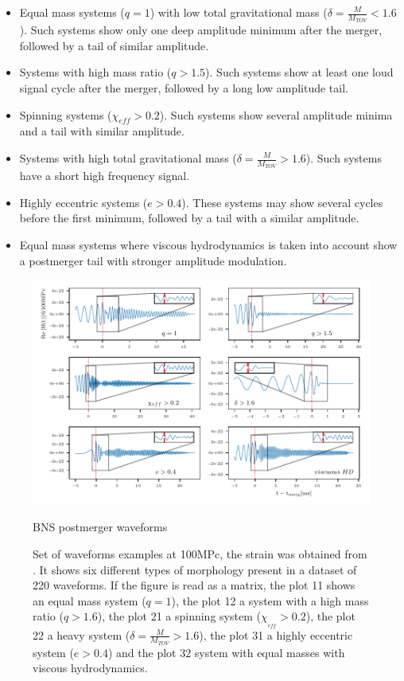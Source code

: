 \begin{itemize}
\item Equal mass systems ($q=1$) with low total gravitational mass ($\delta=\frac{M}{M_{TOV}}<1.6$). Such systems show only one deep amplitude minimum after the merger, followed by a tail of similar amplitude.

\item Systems with high mass ratio ($q>1.5$). Such systems show at least one loud signal cycle after the merger, followed by a long low amplitude tail.

\item Spinning systems ($\chi_{eff}>0.2$). Such systems show several amplitude minima and a tail with similar amplitude.

\item Systems with high total gravitational mass ($\delta=\frac{M}{M_{TOV}}>1.6$). Such systems have a short high frequency signal.

\item Highly eccentric systems ($e>0.4$). These systems may show several cycles before the first minimum, followed by a tail with a similar amplitude.

\item Equal mass systems where viscous hydrodynamics is taken into account show a postmerger tail with stronger amplitude modulation.

\end{itemize}


\begin{figure}[hbt!]
\begin{center}
\includegraphics[width=\textwidth, angle=0]{images/Data_analysis/results/postm_wf_grid.pdf}
\captionsetup{width=0.8\textwidth}
\caption{BNS postmerger waveforms}
\caption*{Set of waveforms examples at 100MPc, the strain was obtained from \cite{}. It shows six different types of morphology present in a dataset of 220 waveforms. If the figure is read as a matrix, the plot 11 shows an equal mass system ($q=1$), the plot 12 a system with a high mass ratio ($q>1.6$), the plot 21 a spinning system ($\chi_{_{eff}}>0.2$), the plot 22 a heavy system ($\delta=\frac{M}{M_{TOV}}>1.6$), the plot 31 a highly eccentric system ($e>0.4$) and the plot 32 system with equal masses with viscous hydrodynamics.}
\end{center}
\label{fig:10}
\end{figure}

